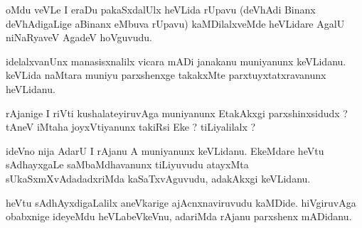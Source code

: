 \begin{artha}
oMdu veVLe I eraDu pakaSxdalUlx heVLida rUpavu (deVhAdi Binanx deVhAdigaLige aBinanx eMbuva rUpavu) kaMDilalxveMde heVLidare AgalU niNaRyaveV AgadeV hoVguvudu.
\end{artha}

\begin{artha}
idelalxvanUnx manasisxnalilx vicara mADi janakanu muniyanunx keVLidanu. keVLida naMtara muniyu parxshenxge takakxMte parxtuyxtatxravanunx heVLidanu.
\end{artha}


\begin{artha}
rAjanige I riVti kushalateyiruvAga muniyanunx EtakAkxgi parxshinxsidudx ? tAneV iMtaha joyxVtiyanunx takiRsi Eke ? tiLiyalilalx ?
\end{artha}


\begin{artha}
ideVno nija AdarU I rAjanu A muniyanunx keVLidanu. EkeMdare heVtu sAdhayxgaLe saMbaMdhavanunx tiLiyuvudu atayxMta sUkaSxmXvAdadadxriMda kaSaTxvAguvudu, adakAkxgi keVLidanu.
\end{artha}

\begin{artha}
heVtu sAdhAyxdigaLalilx aneVkarige ajAcnxnaviruvudu kaMDide. hiVgiruvAga obabxnige ideyeMdu heVLabeVkeVnu, adariMda rAjanu parxshenx mADidanu.
\end{artha}


